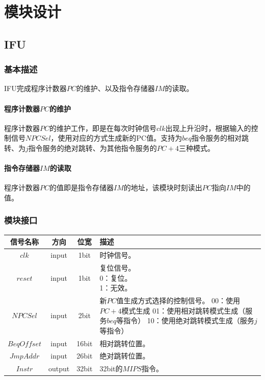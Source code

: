 \documentclass[main.tex]{subfiles}
\begin{document}
\section{模块设计}
\subsection{IFU}
\subsubsection{基本描述}
IFU完成程序计数器$PC$的维护、以及指令存储器$IM$的读取。
\paragraph{程序计数器$PC$的维护}
程序计数器$PC$的维护工作，即是在每次时钟信号$clk$出现上升沿时，根据输入的控制信号$NPCSel$，使用对应的方式生成新的PC值。支持为$beq$指令服务的相对跳转、为$j$指令服务的绝对跳转、为其他指令服务的$PC+4$三种模式。
\paragraph{指令存储器$IM$的读取}
程序计数器$PC$的值即是指令存储器$IM$的地址，该模块时刻读出$PC$指向$IM$中的值。

\subsubsection{模块接口}
\begin{center}
    \begin{tabular}[]{c c c l}
        \toprule
        信号名称 & 方向 & 位宽 & 描述 \\
        \midrule
        $clk$ & input & 1bit & 时钟信号。\\
        $reset$ & input & 1bit & \makecell[lt]{
            复位信号。\\
             0：复位。\\
             1：无效。
        } \\
        $NPCSel$ & input & 2bit & \makecell[lt]{
            新$PC$值生成方式选择的控制信号。\\
             00：使用$PC+4$模式生成\\
             01：使用相对跳转模式生成（服务$beq$等指令）\\
             10：使用绝对跳转模式生成（服务$j$等指令）
        } \\
        \midrule
        $BeqOffset$ & input & 16bit & 相对跳转位置。\\
        $JmpAddr$ & input & 26bit & 绝对跳转位置。 \\
        $Instr$ & output & 32bit & 32bit的$MIPS$指令。\\
        \bottomrule
    \end{tabular}
\end{center}
\end{document}
